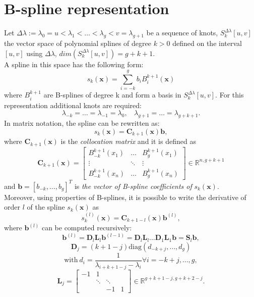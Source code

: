 \section{B-spline representation}
Let $\Delta\lambda := \lambda_0=u < \lambda_1< \dots < \lambda_g < v = \lambda_{g+1} $ be a sequence of knots, $S_k^{\Delta\lambda}[u,v]$ the vector space of polynomial splines of degree $k > 0$ defined on the interval $[u,v]$ using $\Delta\lambda$, $dim(S_k^{\Delta\lambda}[u,v]) = g + k + 1$. \\
A spline in this space has the following form:
\[  s_k(\textbf{x})=\sum\limits_{i=-k}^{g}b_iB_i^{k+1}(\textbf{x}) \]
where ${B_i^{k+1}}$ are B-splines of degree k and form a basis in $S_k^{\Delta\lambda}[u,v]$. For this representation additional knots are required:
\[  \lambda_{-k}= \dots = \lambda_{-1} = \lambda_0,  \ \ \ \ \lambda_{g+1}= \dots = \lambda_{g+k+1}. \]
In matrix notation, the spline can be rewritten as:
\[  s_k(\textbf{x})=  \textbf{C}_{k+1}(\textbf{x})\textbf{b}, \]
where $ \textbf{C}_{k+1}(\textbf{x})$ is the \textit{collocation matrix} and it is defined as
\[  \textbf{C}_{k+1}(\textbf{x}) =
\begin{bmatrix}
B_{-k}^{k+1}(x_1)  & \dots  & B_{g}^{k+1}(x_1) \\
\vdots & \ddots & \vdots \\
B_{-k}^{k+1}(x_n) &  \dots  & B_{g}^{k+1}(x_n)
\end{bmatrix} \in \mathbb{R}^{n, g+k+1} \]
and  $\textbf{b}= [ b_{-k}, \dots, b_{g}]^T$ is \textit{the vector of B-spline coefficients of} $s_k(\textbf{x})$.\\
Moreover, using properties of B-splines, it is possible to write the derivative of order $l$ of the spline $s_k(\textbf{x})$ as
\[  s_k^{(l)}(\textbf{x})=  \textbf{C}_{k+1-l}(\textbf{x})\textbf{b}^{(l)}, \]
where $\textbf{b}^{(l)}$ can be computed recursively:
\[ \textbf{b}^{(l)} = \textbf{D}_l \textbf{L}_l \textbf{b}^{(l-1)}   =  \textbf{D}_l \textbf{L}_l \dots \textbf{D}_1 \textbf{L}_1\textbf{b} = \textbf{S}_l\textbf{b}, \]
\[ \textbf{D}_j =  (k+1-j) \text{diag}(d_{-k+j},\dots, d_g)    \]
\[ \text{with} \ d_i = \frac{1}{\lambda_{i+k+1-j}-\lambda_i}   \forall i = -k+j,\dots, g,  \]
\[ \textbf{L}_j =  \begin{bmatrix}
-1  & 1 &  &\\
 & \ddots & \ddots&\\
 & & -1&1
\end{bmatrix}  \in \mathbb{R}^{g+k+1-j,g+k+2-j}.\]

